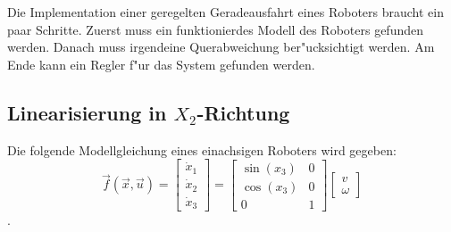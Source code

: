 Die Implementation einer geregelten Geradeausfahrt eines Roboters braucht ein paar Schritte. Zuerst muss ein funktionierdes Modell des Roboters gefunden werden. Danach muss irgendeine Querabweichung ber"ucksichtigt werden. Am Ende kann ein Regler f"ur das System gefunden werden. 

\subsection{Linearisierung in $X_2$-Richtung}

Die folgende Modellgleichung eines einachsigen Roboters wird gegeben:
\begin{equation} \label{eq:model}
    \overrightarrow{f}(\overrightarrow{x}, \overrightarrow{u}) =
    \begin{bmatrix*}
        \dot{x}_1 \\
        \dot{x}_2 \\
        \dot{x}_3
    \end{bmatrix*}
    =
    \begin{bmatrix*}
        \sin(x_3) & 0 \\
        \cos(x_3) & 0 \\
        0 & 1
    \end{bmatrix*}
    \begin{bmatrix*}
        v \\
        \omega
    \end{bmatrix*}
\end{equation}. \\

